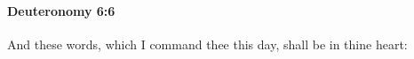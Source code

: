 
		\paragraph{Deuteronomy 6:6} %
			\label{DEUTERONOMY-6-6}

			And these words, which I command thee this day, shall be in thine heart:


